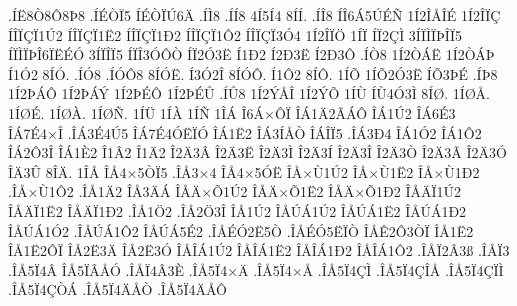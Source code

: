 {.^^cd^^cb8^^d28^^d48^^de8
.^^cd^^c9^^d2^^cf5
^^cd^^c9^^d2^^cf^^da6^^c4
.^^cd^^cc8
.^^cd^^cd8
4^^cd5^^cd4
8^^cd^^cd.
.^^cd^^ce8
^^cd^^ce6^^c15^^da^^c9^^d1
1^^cd2^^ce^^c5^^ce^^c9
1^^cd2^^ce^^cf^^c7
^^cd^^ce^^cf^^c7^^cf1^^da2
^^cd^^ce^^cf^^c7^^cf1^^cb2
^^cd^^ce^^cf^^c7^^cf1^^d02
^^cd^^ce^^cf^^c7^^cf1^^d42
^^cd^^ce^^cf^^c7^^cf3^^d34
1^^cd2^^ce^^cf^^d6
1^^cd^^cf
^^cd^^cf2^^c7^^cc
3^^cd^^cf^^cc^^cf^^de^^ce^^cf5
^^cd^^cf^^cc^^cf^^de^^ce6^^cf^^cb^^c9^^d3
3^^cd^^cf^^ce^^cf5
^^cd^^cf^^ce3^^d3^^d4^^d2
^^cd^^cf2^^d33^^cb
^^cd1^^d02
^^cd2^^d03^^cb
^^cd2^^d03^^d4
.^^cd^^d28
1^^cd2^^d2^^c1^^cb
1^^cd2^^d2^^c1^^de
^^cd1^^d32
8^^cd^^d3.
.^^cd^^d38
.^^cd^^d3^^d48
8^^cd^^d3^^cb.
^^cd3^^d32^^ce
8^^cd^^d3^^d4.
^^cd1^^d42
8^^cd^^d4.
1^^cd^^d5
1^^cd^^d52^^d33^^cb
^^cd^^d53^^de^^c9
.^^cd^^de8
1^^cd2^^de^^c1^^d4
1^^cd2^^de^^c1^^dd
1^^cd2^^de^^c9^^d4
1^^cd2^^de^^c9^^db
.^^cd^^db8
1^^cd2^^dd^^c5^^ce
1^^cd2^^dd^^d5
1^^cd^^d9
^^cd^^d94^^d33^^cc
8^^cd^^d8.
1^^cd^^d8^^c5.
1^^cd^^d8^^c9.
1^^cd^^d8^^c0.
1^^cd^^d8^^d1.
1^^cd^^dc
1^^cd^^c0
1^^cd^^d1
1^^ce^^c1
^^ce6^^c1^^d7^^d4^^cf
^^ce^^c11^^c42^^c3^^c1^^d4
^^ce^^c11^^da2
^^ce^^c16^^c93
^^ce^^c17^^c94^^d7^^ce
.^^ce^^c13^^c94^^da5
^^ce^^c17^^c94^^d3^^cb^^cf^^d3
^^ce^^c11^^cb2
^^ce^^c13^^cd^^c5^^d2
^^ce^^c1^^ce^^cf5
.^^ce^^c13^^d04
^^ce^^c11^^d32
^^ce^^c11^^d42
^^ce^^c12^^d43^^ce
^^ce^^c11^^c82
^^ce1^^c22
^^ce1^^c42
^^ce2^^c43^^c2
^^ce2^^c43^^cb
^^ce2^^c43^^cc
^^ce2^^c43^^cd
^^ce2^^c43^^ce
^^ce2^^c43^^d2
^^ce2^^c43^^c3
^^ce2^^c43^^d3
^^ce^^c43^^db
8^^ce^^c4.
1^^ce^^c5
^^ce^^c54^^d75^^d2^^cf5
.^^ce^^c53^^d74
^^ce^^c54^^d75^^d3^^cb
^^ce^^c5^^d7^^d91^^da2
^^ce^^c5^^d7^^d91^^cb2
^^ce^^c5^^d7^^d91^^d02
.^^ce^^c5^^d7^^d91^^d42
.^^ce^^c51^^c42
^^ce^^c53^^c4^^c1
^^ce^^c5^^c4^^d7^^d51^^da2
^^ce^^c5^^c4^^d7^^d51^^cb2
^^ce^^c5^^c4^^d7^^d51^^d02
^^ce^^c5^^c4^^cf1^^da2
^^ce^^c5^^c4^^cf1^^cb2
^^ce^^c5^^c4^^cf1^^d02
.^^ce^^c51^^d62
.^^ce^^c52^^d63^^ce
^^ce^^c51^^da2
^^ce^^c5^^da^^c11^^da2
^^ce^^c5^^da^^c11^^cb2
^^ce^^c5^^da^^c11^^d02
^^ce^^c5^^da^^c11^^d32
.^^ce^^c5^^da^^c11^^d42
^^ce^^c5^^da^^c15^^c92
.^^ce^^c5^^c9^^d32^^cb5^^d2
.^^ce^^c5^^c9^^d35^^cb^^cf^^d2
^^ce^^c5^^ca2^^d43^^d2^^cf
^^ce^^c51^^cb2
^^ce^^c51^^cb2^^d4^^cf
^^ce^^c52^^cb3^^c4
^^ce^^c52^^cb3^^d3
^^ce^^c5^^ce^^c11^^da2
^^ce^^c5^^ce^^c11^^cb2
^^ce^^c5^^ce^^c11^^d02
^^ce^^c5^^ce^^c11^^d42
.^^ce^^c5^^cf2^^c23^^df
.^^ce^^c5^^cf3
.^^ce^^c55^^cf4^^c2
^^ce^^c55^^cf^^c2^^c5^^d3
.^^ce^^c5^^cf4^^c23^^c8
.^^ce^^c55^^cf4^^d7^^c4
.^^ce^^c55^^cf4^^d7^^c5
.^^ce^^c55^^cf4^^c7^^cc
.^^ce^^c55^^cf4^^c7^^ce^^c5
.^^ce^^c55^^cf4^^c7^^cf^^cc
.^^ce^^c55^^cf4^^c7^^d2^^c1
.^^ce^^c55^^cf4^^c4^^c5^^d2
.^^ce^^c55^^cf4^^c4^^c5^^d4
}
